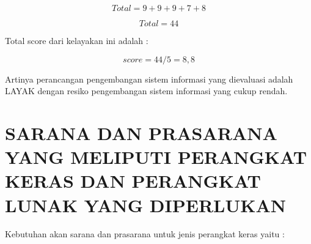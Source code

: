 \documentclass[pdftex,12pt, oneside]{article}
\begin{document}
\[ Total = 9 + 9 + 9 + 7 + 8 \]

\[ Total = 44 \]

Total score dari kelayakan ini adalah :

\[ score = 44 / 5 = 8,8 \]

Artinya perancangan pengembangan sistem informasi yang dievaluasi adalah LAYAK dengan resiko pengembangan sistem informasi yang cukup rendah.

\section{SARANA DAN PRASARANA YANG MELIPUTI PERANGKAT KERAS DAN PERANGKAT LUNAK YANG DIPERLUKAN}

Kebutuhan akan sarana dan prasarana untuk jenis perangkat keras yaitu :
\end{document}
